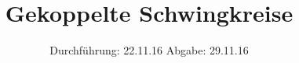

\subject{V355}
\title{Gekoppelte Schwingkreise}
\date{
  Durchführung: 22.11.16
  \hspace{3em}
  Abgabe: 29.11.16
}



\maketitle
\thispagestyle{empty}
\tableofcontents
\newpage






\printbibliography


